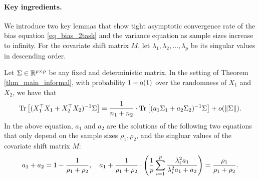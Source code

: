 \paragraph{Key ingredients.}
We introduce two key lemmas that show tight asymptotic convergence rate of the bias equation \eqref{eq_bias_2task} and the variance equation  as sample sizes increase to infinity.
For the covariate shift matrix $M$, let $\lambda_1, \lambda_2, \dots, \lambda_p$ be its singular values in descending order.

\begin{lemma}\label{lem_cov_shift}
	Let $\Sigma \in \mathbb{R}^{p \times p}$ be any fixed and deterministic matrix.
	In the setting of Theorem \ref{thm_main_informal},
	with probability $1-\operatorname{o}(1)$ over the randomness of $X_1$ and $X_2$, we have that %
	\begin{align}\label{lem_cov_shift_eq}
		\bigtr{(X_1^{\top}X_1 + X_2^{\top}X_2)^{-1} \Sigma} = \frac{1}{n_1 + n_2}\cdot \bigtr{ (a_1 \Sigma_1 + a_2\Sigma_2)^{-1} \Sigma} + o(\norm{\Sigma}). %
	\end{align}
	In the above equation, $a_1$ and $a_2$ are the solutions of the following two equations that only depend on the sample sizes $\rho_1, \rho_2$, and the singluar values of the covariate shift matrix $M$:
	\begin{align}
		a_1 + a_2 = 1- \frac{1}{\rho_1 + \rho_2},\quad a_1 + \frac1{\rho_1 + \rho_2}\cdot \left({\frac{1}{p}\sum_{i=1}^p \frac{\lambda_i^2 a_1}{\lambda_i^2 a_1 + a_2}}\right) = \frac{\rho_1}{\rho_1 + \rho_2}. \label{eq_a12extra}
	\end{align}
\end{lemma}

